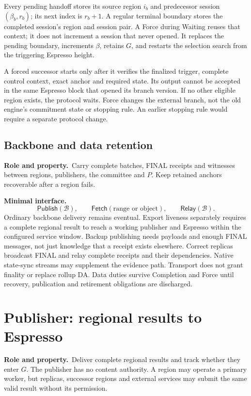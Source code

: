 \documentclass[11pt,a4paper]{article}
\newcommand{\api}[1]{\ensuremath{\mathsf{#1}}}
\newcommand{\role}{\textbf{Role and property.}\ }
\newcommand{\iface}{\textbf{Minimal interface.}\ }
\begin{document}
Every pending handoff stores its source region $i_b$ and predecessor
session $(\beta_b,r_b)$; its next index is $r_b+1$. A regular terminal boundary stores the completed session's
region and session pair. A Force during Waiting reuses
that context; it does not increment a session that never opened. It
replaces the pending boundary, increments $\beta$, retains $G$, and restarts the
selection search from the triggering Espresso height.

A forced successor starts only after it verifies the finalized trigger,
complete control context, exact anchor and required state. Its output
cannot be accepted in the same Espresso block that opened its branch version.
If no other eligible region exists, the protocol waits. Force changes
the external branch, not the old engine's commitment state or stopping
rule. An earlier stopping rule would require a separate protocol change.

\subsection{Backbone and data retention}
\role Carry complete batches, FINAL receipts and witnesses between
regions, publishers, the committee and $P$. Keep retained anchors
recoverable after a region fails.

\iface
\[
 \api{Publish}(\mathcal B),\qquad
 \api{Fetch}(\text{range or object}),\qquad
 \api{Relay}(\mathcal B).
\]
Ordinary backbone delivery remains eventual. Export liveness separately
requires a complete regional result to reach a working publisher and
Espresso within the configured service window. Backup publishing needs
payloads and enough FINAL messages, not just knowledge that a receipt
exists elsewhere. Correct replicas broadcast FINAL and relay complete
receipts and their dependencies. Native state-sync streams may supplement
the evidence path. Transport does not grant finality or replace rollup
DA. Data duties survive Completion and Force until recovery, publication
and retirement obligations are discharged.

\section{Publisher: regional results to Espresso}\label{sec:publisher}
\role Deliver complete regional results and track whether they enter
$G$. The publisher has no content authority. A region may operate a
primary worker, but replicas, successor regions and external services
may submit the same valid result without its permission.
\end{document}
